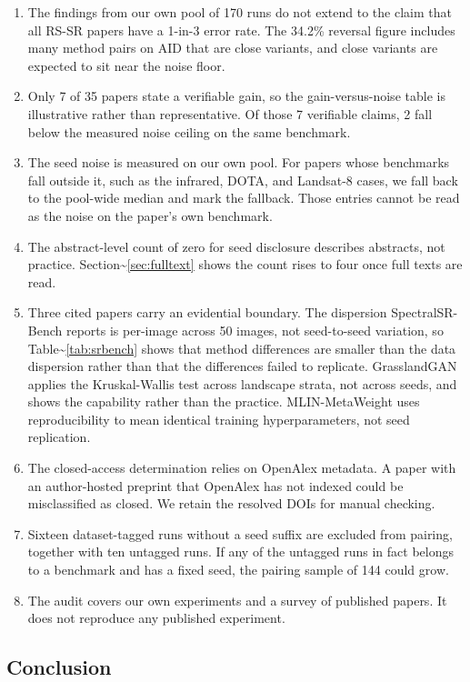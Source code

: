 \documentclass{interact}
\begin{document}
\begin{enumerate}
\item The findings from our own pool of 170 runs do not extend to the claim that all RS-SR papers have a 1-in-3 error rate. The 34.2\% reversal figure includes many method pairs on AID that are close variants, and close variants are expected to sit near the noise floor.
\item Only 7 of 35 papers state a verifiable gain, so the gain-versus-noise table is illustrative rather than representative. Of those 7 verifiable claims, 2 fall below the measured noise ceiling on the same benchmark.
\item The seed noise is measured on our own pool. For papers whose benchmarks fall outside it, such as the infrared, DOTA, and Landsat-8 cases, we fall back to the pool-wide median and mark the fallback. Those entries cannot be read as the noise on the paper's own benchmark.
\item The abstract-level count of zero for seed disclosure describes abstracts, not practice. Section\textasciitilde{}\ref{sec:fulltext} shows the count rises to four once full texts are read.
\item Three cited papers carry an evidential boundary. The dispersion SpectralSR-Bench reports is per-image across 50 images, not seed-to-seed variation, so Table\textasciitilde{}\ref{tab:srbench} shows that method differences are smaller than the data dispersion rather than that the differences failed to replicate. GrasslandGAN applies the Kruskal-Wallis test across landscape strata, not across seeds, and shows the capability rather than the practice. MLIN-MetaWeight uses reproducibility to mean identical training hyperparameters, not seed replication.
\item The closed-access determination relies on OpenAlex metadata. A paper with an author-hosted preprint that OpenAlex has not indexed could be misclassified as closed. We retain the resolved DOIs for manual checking.
\item Sixteen dataset-tagged runs without a seed suffix are excluded from pairing, together with ten untagged runs. If any of the untagged runs in fact belongs to a benchmark and has a fixed seed, the pairing sample of 144 could grow.
\item The audit covers our own experiments and a survey of published papers. It does not reproduce any published experiment.
\end{enumerate}

\subsection{Conclusion}\label{sec:conclusion}
\end{document}
